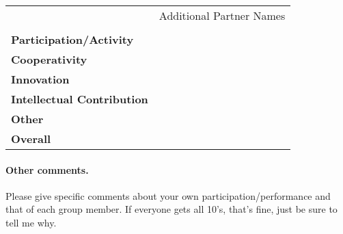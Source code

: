 \documentclass[12pt]{article}
\begin{document}
\newpage
\begin{center}
\begin{tabular}{|p{1.2in}| p{1in} | p{1in} | p{1in} |}
\cline{1-4}
  & \multicolumn{3}{c|}{Additional Partner Names}\\
\cline{2-4}
& \centering  &  & \\
\cline{1-4}
\bf Participation/\newline Activity & & &  \\[12pt]
\cline{1-4}
\bf Cooperativity &  & & \\[12pt]
\cline{1-4}
\bf Innovation &  & & \\[12pt]
\cline{1-4}
\bf Intellectual \newline Contribution  & & & \\[12pt]
\hline
\bf Other  & & & \\[12pt]
\hline
\hline
\bf Overall & &  &  \\[12pt]
\cline{1-4}
\end{tabular}
\end{center}
\paragraph{Other comments.} Please give specific comments about your own participation/performance and that of each group member.  If everyone gets all 10's, that's fine, just be sure to tell me why.
\end{document}
